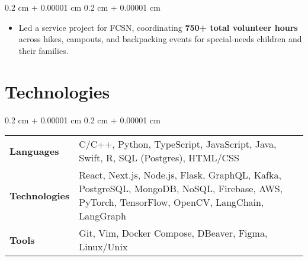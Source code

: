 \documentclass[10pt, letterpaper]{article}
\newenvironment{highlights}{
    \begin{itemize}[
        topsep=0.10 cm,
        parsep=0.10 cm,
        partopsep=0pt,
        itemsep=0pt,
        leftmargin=0.4 cm + 10pt
    ]
}{
    \end{itemize}
} %
\newenvironment{onecolentry}{
    \begin{adjustwidth}{
        0.2 cm + 0.00001 cm
    }{
        0.2 cm + 0.00001 cm
    }
}{
    \end{adjustwidth}
} %
\begin{document}
        \vspace{0.10 cm}
        \begin{onecolentry}
            \begin{highlights}
                \item Led a service project for FCSN, coordinating \textbf{750+ total volunteer hours} across hikes, campouts, and backpacking events for special-needs children and their families.
            \end{highlights}
        \end{onecolentry}


    \section{Technologies}
    
        \begin{onecolentry}
            \begin{tabularx}{\textwidth}{@{}p{2.15cm}Y@{}}
                \textbf{Languages} & C/C++, Python, TypeScript, JavaScript, Java, Swift, R, SQL (Postgres), HTML/CSS \\[0.1cm]
                \textbf{Technologies} & React, Next.js, Node.js, Flask, GraphQL, Kafka, PostgreSQL, MongoDB, NoSQL, Firebase, AWS, PyTorch, TensorFlow, OpenCV, LangChain, LangGraph \\[0.5cm]
                \textbf{Tools} & Git, Vim, Docker Compose, DBeaver, Figma, Linux/Unix
            \end{tabularx}
        \end{onecolentry}
\end{document}

